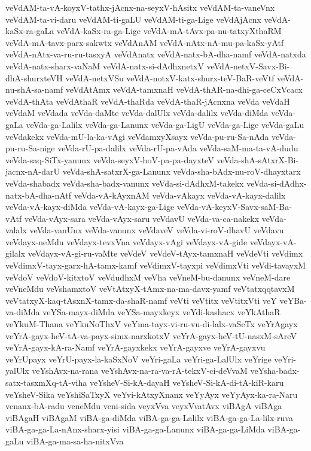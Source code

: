 {veVdAM-ta-vA-koyxV-tathx-jAcnx-na-seyxV-hAsitx
veVdAM-ta-vaneVnx
veVdAM-ta-vi-daru
veVdAM-ti-gaLU
veVdAM-ti-ga-Lige
veVdAjAcnx
veVdA-kaSx-ra-gaLa
veVdA-kaSx-ra-ga-Lige
veVdA-mA-tAvx-pa-nu-tatxyXthaRM
veVdA-mA-tavx-parx-sakwtx
veVdAnAM
veVdA-nAtx-nA-mu-pa-kaSx-yAtf
veVdA-nAtx-va-ru-ru-tasxyA
veVdAnatx
veVdA-natx-bA-dha-namf
veVdA-natxda
veVdA-natx-sharx-vaNaM
veVdA-natx-si-dAdhxnetxV
veVdA-netxV-Savx-Bi-dhA-shurxteVH
veVdA-netxVSu
veVdA-notxV-katx-shurx-teV-BaR-veVtf
veVdA-nu-shA-sa-namf
veVdAtAmx
veVdA-tamxnaH
veVdA-thAR-na-dhi-ga-ceCxVcacx
veVdA-thAta
veVdAthaR
veVdA-thaRda
veVdA-thaR-jAcnxna
veVda
veVdaH
veVdaM
veVdada
veVda-daMte
veVda-dalUlx
veVda-dalilx
veVda-diMda
veVda-gaLa
veVda-ga-Lalilx
veVda-ga-Lanunx
veVda-ga-LigU
veVda-ga-Lige
veVda-gaLu
veVdakekx
veVda-mU-la-ka-vAgi
veVdamxyXsayx
veVda-pu-ru-Sa-nAda
veVda-pu-ru-Sa-nige
veVda-rU-pa-dalilx
veVda-rU-pa-vAda
veVda-saM-ma-ta-vA-dudu
veVda-saq-SiTx-yanunx
veVda-seyxV-hoV-pa-pa-dayxteV
veVda-shA-sAtxrX-Bi-jacnx-nA-darU
veVda-shA-satxrX-ga-Lanunx
veVda-sha-bAdx-nu-roV-dhayxtarx
veVda-shabadx
veVda-sha-badx-vanunx
veVda-si-dAdhxM-takekx
veVda-si-dAdhx-natx-bA-dha-nAtf
veVda-vA-kAyxnAM
veVda-vAkayx
veVda-vA-kayx-dalilx
veVda-vA-kayx-diMda
veVda-vA-kayx-ga-Lige
veVda-vA-keyxV-Savx-saM-Ba-vAtf
veVda-vAyx-sara
veVda-vAyx-saru
veVdavU
veVda-va-ca-nakekx
veVda-valalx
veVda-vanUnx
veVda-vanunx
veVdaveV
veVda-vi-roV-dhavU
veVdavu
veVdayx-neMdu
veVdayx-tevxVna
veVdayx-vAgi
veVdayx-vA-gide
veVdayx-vA-gilalx
veVdayx-vA-gi-ru-vaMte
veVdeV
veVdeV-tAyx-tamxnaH
veVdeVti
veVdimx
veVdimxV-tayx-garx-hA-tamx-kamf
veVdimxV-tayxpi
veVdimxVti
veVdi-tavayxM
veVdoV
veVdoV-kitxtoV
veVdudhxM
veVha
veVneM-bu-danunx
veVneM-dare
veVneMdu
veVshamxtoV
veVtAtxyX-tAmx-na-ma-davx-yamf
veVtatxqqtavxM
veVtatxyX-kaq-tAsxnX-tamx-da-shaR-namf
veVti
veVtitx
veVtitxVti
veY
veYBa-va-diMda
veYSa-mayx-diMda
veYSa-mayxkeyx
veYdi-kashacx
veYkAthaR
veYkuM-Thana
veYkuNoThxV
veYma-tayx-vi-ru-vu-di-lalx-vaSeTx
veYrAgayx
veYrA-gayx-heV-tA-va-payx-simx-narxkotxV
veYrA-gayx-heV-tU-nasxM-sAreV
veYrA-gayx-kA-ra-Namf
veYrA-gayxkekx
veYrA-gayxve
veYrA-gayxvu
veYrUpayx
veYrU-payx-la-kaSxNoV
veYri-gaLa
veYri-ga-LalUlx
veYrige
veYri-yalUlx
veYshAvx-na-rana
veYshAvx-na-ra-va-rA-tekxV-ci-deVvaM
veYsha-badx-satx-tasxmXq-tA-viha
veYsheV-Si-kA-dayaH
veYsheV-Si-kA-di-tA-kiR-karu
veYsheV-Sika
veYshiSaTxyX
veYvi-kAtxyXnanx
veYyAyx
veYyAyx-ka-ra-Naru
venanx-bA-radu
veneMdu
veni-sida
veyxVva
veyxVvatAvx
viBAgA
viBAga
viBAgaH
viBAgaM
viBA-ga-diMda
viBA-ga-ga-Lalilx
viBA-ga-ga-La-lilx-ruva
viBA-ga-ga-La-nAnx-sharx-yisi
viBA-ga-ga-Lanunx
viBA-ga-ga-LiMda
viBA-ga-gaLu
viBA-ga-ma-sa-ha-nitxVva
}
